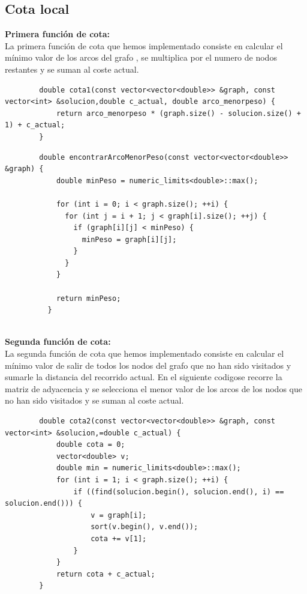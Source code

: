 \documentclass[11pt,openany]{book}
\begin{document}
\subsection{Cota local}
\textbf{Primera función de cota:} \\
    La primera función de cota que hemos implementado consiste en calcular el mínimo valor de los arcos del grafo ,
     se multiplica por el numero de nodos restantes y se suman al coste actual.
    \begin{lstlisting}
        double cota1(const vector<vector<double>> &graph, const vector<int> &solucion,double c_actual, double arco_menorpeso) {
            return arco_menorpeso * (graph.size() - solucion.size() + 1) + c_actual;
        }

    \end{lstlisting}
    \begin{lstlisting}
        double encontrarArcoMenorPeso(const vector<vector<double>> &graph) {
            double minPeso = numeric_limits<double>::max();
          
            for (int i = 0; i < graph.size(); ++i) {
              for (int j = i + 1; j < graph[i].size(); ++j) {
                if (graph[i][j] < minPeso) {
                  minPeso = graph[i][j];
                }
              }
            }
          
            return minPeso;
          }
          

    \end{lstlisting}
\textbf{Segunda función de cota:} \\
    La segunda función de cota que hemos implementado consiste en calcular el mínimo valor de salir de todos los nodos del grafo que no 
    han sido visitados y sumarle la distancia del recorrido actual.
    En el siguiente codigose recorre la matriz de adyacencia y se selecciona el menor valor de los arcos de los nodos que no han sido visitados 
    y se suman al coste actual.
    \begin{lstlisting}
        double cota2(const vector<vector<double>> &graph, const vector<int> &solucion,=double c_actual) {
            double cota = 0;
            vector<double> v;
            double min = numeric_limits<double>::max();
            for (int i = 1; i < graph.size(); ++i) {
                if ((find(solucion.begin(), solucion.end(), i) == solucion.end())) {
                    v = graph[i];
                    sort(v.begin(), v.end());
                    cota += v[1];
                }
            }
            return cota + c_actual;
        }
    \end{lstlisting}
\end{document}
